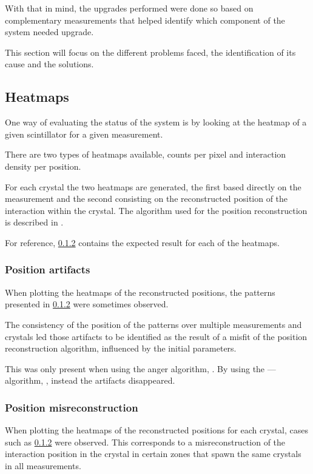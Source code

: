 With that in mind, the upgrades performed were done so based on complementary measurements that helped identify which component of the system needed upgrade.

This section will focus on the different problems faced, the identification of its cause and the solutions.

\subsection{Heatmaps}

One way of evaluating the status of the system is by looking at the heatmap of a given scintillator for a given measurement.

There are two types of heatmaps available, counts per pixel and interaction density per position.

For each crystal the two heatmaps are generated, the first based directly on the measurement and the second consisting on the reconstructed position of the interaction within the crystal. The algorithm used for the position reconstruction is described in \cite{}.

For reference, \ref{} contains the expected result for each of the heatmaps.

\subsubsection{Position artifacts}

When plotting the heatmaps of the reconstructed positions, the patterns presented in \ref{} were sometimes observed.

The consistency of the position of the patterns over multiple measurements and crystals led those artifacts to be identified as the result of a misfit of the position reconstruction algorithm, influenced by the initial parameters.

This was only present when using the anger algorithm, \cite{}. By using the --- algorithm, \cite{}, instead the artifacts disappeared.

\subsubsection{Position misreconstruction}

When plotting the heatmaps of the reconstructed positions for each crystal, cases such as \ref{} were observed. This corresponds to a misreconstruction of the interaction position in the crystal in certain zones that spawn the same crystals in all measurements.

